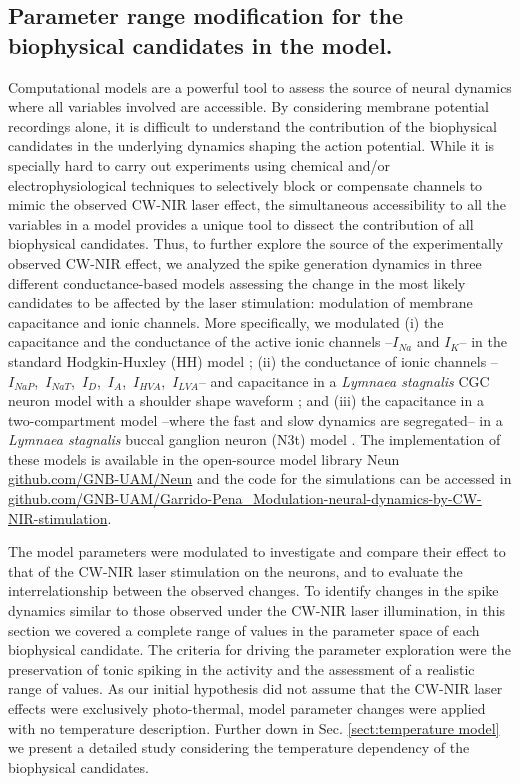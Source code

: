 \subsection{Parameter range modification for the biophysical candidates in the model. }
Computational models are a powerful tool to assess the source of neural dynamics where all variables involved are accessible. By considering membrane potential recordings alone, it is difficult to understand the contribution of the biophysical candidates in the underlying dynamics shaping the action potential. While it is specially hard to carry out experiments using chemical and/or electrophysiological techniques to selectively block or compensate channels to mimic the observed CW-NIR laser effect, the simultaneous accessibility to all the variables in a model provides a unique tool to dissect the contribution of all biophysical candidates. Thus, to further explore the source of the experimentally observed CW-NIR effect, we analyzed the spike generation dynamics in three different conductance-based models assessing the change in the most likely candidates to be affected by the laser stimulation: modulation of membrane capacitance and ionic channels. More specifically, we modulated (i) the capacitance and the conductance of the active ionic channels --$I_{Na}$ and $I_{K}$-- in the standard Hodgkin-Huxley (HH) model \parencite{HODGKIN1952}; (ii) the conductance of ionic channels --$I_{NaP}$,~$I_{NaT}$,~$I_{D}$,~$I_{A}$,~$I_{HVA}$,~$I_{LVA}$-- and capacitance in a \textit{Lymnaea stagnalis} CGC neuron model with a shoulder shape waveform \parencite{vavoulis_balanced_2010}; and (iii) the capacitance in a two-compartment model --where the fast and slow dynamics are segregated-- in a \textit{Lymnaea stagnalis} buccal ganglion neuron (N3t) model \parencite{Vavoulis2007}. The implementation of these models is available in the open-source model library Neun \href{https://github.com/GNB-UAM/neun}{github.com/GNB-UAM/Neun} and the code for the simulations can be accessed in \href{https://github.com/GNB-UAM/Garrido-Pena_Modulation-neural-dynamics-by-CW-NIR-stimulation}{github.com/GNB-UAM/Garrido-Pena\_Modulation-neural-dynamics-by-CW-NIR-stimulation}.

The model parameters were modulated to investigate and compare their effect to that of the CW-NIR laser stimulation on the neurons, and to evaluate the interrelationship between the observed changes. To identify changes in the spike dynamics similar to those observed under the CW-NIR laser illumination, in this section we covered a complete range of values in the parameter space of each biophysical candidate. The criteria for driving the parameter exploration were the preservation of tonic spiking in the activity and the assessment of a realistic range of values.
As our initial hypothesis did not assume that the CW-NIR laser effects were exclusively photo-thermal, model parameter changes were applied with no temperature description. Further down in Sec. \ref{sect:temperature model} we present a detailed study considering the temperature dependency of the biophysical candidates. 

